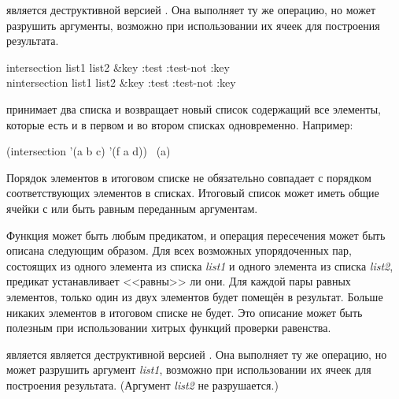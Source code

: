\begin{defun}[Функция]
 является деструктивной версией .
Она выполняет ту же операцию, но может разрушить аргументы, возможно при
использовании их ячеек для построения результата.
\end{defun}

\begin{defun}[Функция]
intersection list1 list2 &key :test :test-not :key \\
nintersection list1 list2 &key :test :test-not :key

 принимает два списка и возвращает новый список содержащий все
элементы, которые есть и в первом и во втором списках одновременно.
Например:
\begin{lisp}
(intersection '(a b c) '(f a d)) \EV\ (a)
\end{lisp}

Порядок элементов в итоговом списке не обязательно совпадает с порядком
соответствующих элементов в списках.
Итоговый список может иметь общие ячейки с или быть равным  переданным
аргументам.

Функция  может быть любым предикатом, и операция пересечения может
быть описана следующим образом. Для всех возможных упорядоченных пар, состоящих
из одного элемента из списка \emph{list1} и одного элемента из списка
\emph{list2}, предикат устанавливает <<равны>> ли они. Для каждой пары равных
элементов, только один из двух элементов будет помещён в результат. Больше
никаких элементов в итоговом списке не будет. Это описание может быть полезным
при использовании хитрых функций проверки равенства.

 является является деструктивной версией .
Она выполняет ту же операцию, но может разрушить аргумент \emph{list1}, возможно при
использовании их ячеек для построения результата. (Аргумент \emph{list2} не
разрушается.)
\end{defun}

